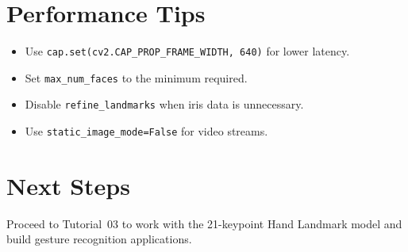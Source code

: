 \documentclass[12pt,a4paper]{article}
\begin{document}
\section{Performance Tips}

\begin{itemize}
    \item Use \texttt{cap.set(cv2.CAP\_PROP\_FRAME\_WIDTH, 640)} for lower latency.
    \item Set \texttt{max\_num\_faces} to the minimum required.
    \item Disable \texttt{refine\_landmarks} when iris data is unnecessary.
    \item Use \texttt{static\_image\_mode=False} for video streams.
\end{itemize}

\section{Next Steps}

Proceed to Tutorial~03 to work with the 21-keypoint Hand Landmark model and build gesture
recognition applications.
\end{document}
